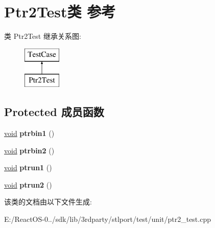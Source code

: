 \hypertarget{class_ptr2_test}{}\section{Ptr2\+Test类 参考}
\label{class_ptr2_test}
类 Ptr2\+Test 继承关系图\+:\begin{figure}[H]
\begin{center}
\leavevmode
\includegraphics[height=2.000000cm]{class_ptr2_test}
\end{center}
\end{figure}
\subsection*{Protected 成员函数}
\begin{DoxyCompactItemize}
\item 
\mbox{\label{class_ptr2_test_a2b7047b8836c576db69b0bc161a2aae4}} 
\hyperlink{interfacevoid}{void} {\bfseries ptrbin1} ()
\item 
\mbox{\label{class_ptr2_test_a7ad5db5e721c2f19e55b879e0741e199}} 
\hyperlink{interfacevoid}{void} {\bfseries ptrbin2} ()
\item 
\mbox{\label{class_ptr2_test_a84972a5aa22caa1291f275618fc4c2e0}} 
\hyperlink{interfacevoid}{void} {\bfseries ptrun1} ()
\item 
\mbox{\label{class_ptr2_test_ac5c63b43b01eff8633d1a9fce0171549}} 
\hyperlink{interfacevoid}{void} {\bfseries ptrun2} ()
\end{DoxyCompactItemize}


该类的文档由以下文件生成\+:\begin{DoxyCompactItemize}
\item 
E\+:/\+React\+O\+S-\/0../sdk/lib/3rdparty/stlport/test/unit/ptr2\+\_\+test.\+cpp\end{DoxyCompactItemize}
